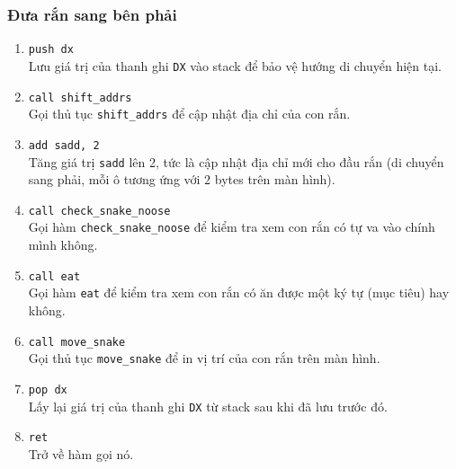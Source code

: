 \documentclass[12pt]{article}
\begin{document}
\subsubsection*{Đưa rắn sang bên phải}
\begin{enumerate}[label=\textbf{\arabic*.}]
      \begin{figure}[H]
  \centering
  \texttt{[image: pics/mr.png]}
\end{figure}
    \item \texttt{push dx} \\
    Lưu giá trị của thanh ghi \texttt{DX} vào stack để bảo vệ hướng di chuyển hiện tại.
    
    \item \texttt{call shift\_addrs} \\
    Gọi thủ tục \texttt{shift\_addrs} để cập nhật địa chỉ của con rắn.
    
    \item \texttt{add sadd, 2} \\
    Tăng giá trị \texttt{sadd} lên 2, tức là cập nhật địa chỉ mới cho đầu rắn (di chuyển sang phải, mỗi ô tương ứng với 2 bytes trên màn hình).
    
    \item \texttt{call check\_snake\_noose} \\
    Gọi hàm \texttt{check\_snake\_noose} để kiểm tra xem con rắn có tự va vào chính mình không.
    
    \item \texttt{call eat} \\
    Gọi hàm \texttt{eat} để kiểm tra xem con rắn có ăn được một ký tự (mục tiêu) hay không.
    
    \item \texttt{call move\_snake} \\
    Gọi thủ tục \texttt{move\_snake} để in vị trí của con rắn trên màn hình.
    
    \item \texttt{pop dx} \\
    Lấy lại giá trị của thanh ghi \texttt{DX} từ stack sau khi đã lưu trước đó.
    
    \item \texttt{ret} \\
    Trở về hàm gọi nó.
\end{enumerate}
\end{document}
